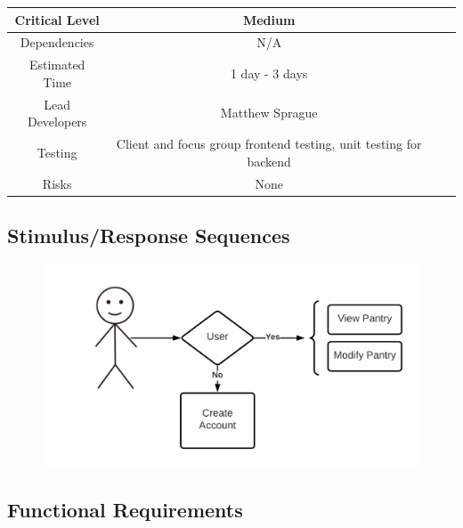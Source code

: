 \documentclass{scrreprt}
\begin{document}
\begin{center}
    \begin{tabular}{| c | c | c | c |}
        \hline
        Critical Level  & Medium                                                            \\
        \hline
        Dependencies    & N/A                                                               \\
        \hline
        Estimated Time  & 1 day - 3 days                                                    \\
        \hline
        Lead Developers & Matthew Sprague                                 \\
        \hline
        Testing         & Client and focus group \gls{frontend} testing,
                          \gls{unit testing} for \gls{backend}                              \\
        \hline
        Risks           & None                                                              \\
        \hline
    \end{tabular}
\end{center}

\subsection{Stimulus/Response Sequences}

\begin{figure}[H]\centering
    \includegraphics[width=\columnwidth]{FlowCharts/Profile-Pantry.png}
\end{figure}

\subsection{\gls{Functional Requirements}}
\end{document}
